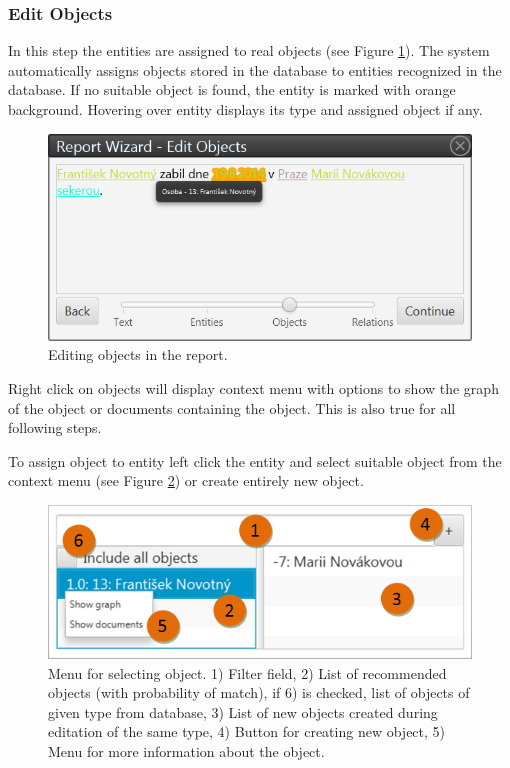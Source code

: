 \subsubsection{Edit Objects}
\label{sssec:EditObjects}

In this step the entities are assigned to real objects (see Figure
\ref{fig:Objects}). The system automatically assigns objects stored in the
database to entities recognized in the database. If no suitable object is
found, the entity is marked with orange background. Hovering over entity
displays its type and assigned object if any.

\begin{figure}[!htb]
        \centering
        \includegraphics[width=\textwidth]{Images/objects}
        \caption{Editing objects in the report.}
        \label{fig:Objects}
\end{figure}

Right click on objects will display context menu with options to show the graph
of the object or documents containing the object. This is also true for all following steps.

To assign object to entity left click the entity and select suitable object
from the context menu (see Figure \ref{fig:ObjectMenu}) or create entirely new
object.

\begin{figure}[!htb]
        \centering
        \includegraphics[width=\textwidth]{Images/objectmenu}
        \caption{Menu for selecting object. 1) Filter field, 2) List of
		 recommended objects (with probability of match), if 6) is checked, list
		 of objects of given type from database, 3) List of new objects created
		 during editation of the same type, 4) Button for creating new object,
		 5) Menu for more information about the object.}
        \label{fig:ObjectMenu}
\end{figure}

